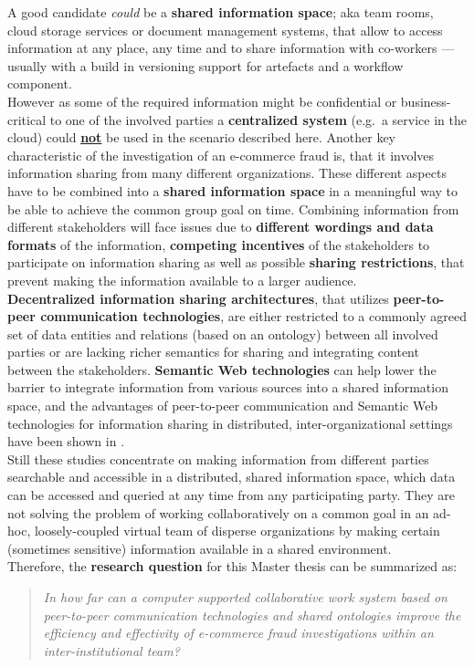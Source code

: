 A good candidate \textit{could} be a \textbf{shared information space}; aka team rooms, cloud storage services or document management systems, that allow to access information at any place,
any time and to share information with co-workers --- usually with a build in versioning support for artefacts and a workflow component. \\

However as some of the required information might be confidential or business-critical to one of the involved parties a \textbf{centralized system} (e.g.\ a service in the cloud) could \textbf{\underline{not}} be used in the scenario described here.
Another key characteristic of the investigation of an e-commerce fraud is, that it involves information sharing from many different organizations. These different aspects have to be combined into a \textbf{shared information space} in a meaningful way
to be able to achieve the common group goal on time. Combining information from different stakeholders will face issues due to \textbf{different wordings and data formats} of the information,
\textbf{competing incentives} of the stakeholders to participate on information sharing as well as possible \textbf{sharing restrictions}, that prevent making the information available to a larger audience. \\

\textbf{Decentralized information sharing architectures}, that utilizes \textbf{peer-to-peer communication technologies}, are either restricted to a commonly agreed set of data entities and relations (based on an ontology) between all involved parties
or are lacking richer semantics for sharing and integrating content between the stakeholders. \textbf{Semantic Web technologies} can help lower the barrier to integrate information from various sources into a shared information space,
and the advantages of peer-to-peer communication and Semantic Web technologies for information sharing in distributed, inter-organizational settings have been shown in \citep{Staab2006}. \\

Still these studies concentrate on making information from different parties searchable and accessible in a distributed, shared information space, which data can be accessed and queried at any time from any participating party.
They are not solving the problem of working collaboratively on a common goal in an ad-hoc, loosely-coupled virtual team of disperse organizations by making certain (sometimes sensitive) information available in a shared environment. \\

Therefore, the \textbf{research question} for this Master thesis can be summarized as:
\begin{quotation}
  \textit{In how far can a computer supported collaborative work system based on peer-to-peer communication technologies and shared ontologies improve the efficiency and effectivity of e-commerce fraud investigations within an inter-institutional team?}
\end{quotation}

